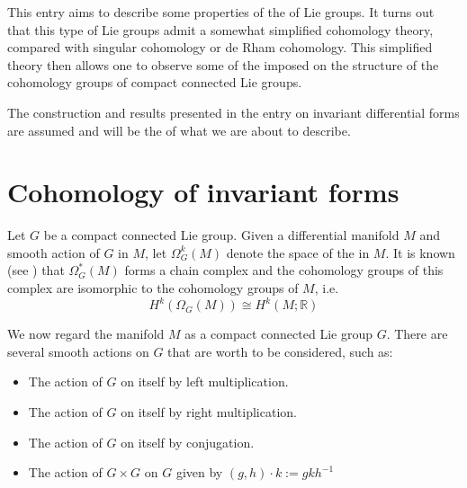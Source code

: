 \documentclass[12pt]{article}
\begin{document}

This entry aims to describe some properties of the  of   Lie groups. It turns out that this type of Lie groups admit a somewhat simplified cohomology theory, compared with singular cohomology or de Rham cohomology. This simplified theory then allows one to observe some of the  imposed on the structure of the cohomology groups of compact connected Lie groups.

The construction and results presented in the entry on invariant differential forms are assumed and will be the  of what we are about to describe.

\section{Cohomology of invariant forms}

Let $G$ be a compact connected Lie group. Given a differential manifold $M$ and smooth action of $G$ in $M$, let $\Omega_G^k(M)$ denote the space of the  in $M$. It is known (see ) that $\Omega_G^*(M)$ forms a chain complex and the cohomology groups of this complex are isomorphic to the cohomology groups of $M$, i.e.
\begin{displaymath}
H^k(\Omega_G(M)) \cong H^k(M;\mathbb{R})
\end{displaymath}

We now regard the manifold $M$ as a compact connected Lie group $G$. There are several smooth actions on $G$ that are worth to be considered, such as:
\begin{itemize}
\item The action of $G$ on itself by left multiplication.
\item The action of $G$ on itself by right multiplication.
\item The action of $G$ on itself by conjugation.
\item The action of $G\times G$ on $G$ given by $(g,h)\cdot k :=gkh^{-1}$
\end{itemize}
\end{document}
